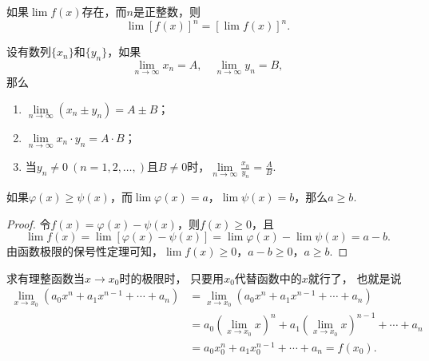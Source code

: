 \begin{corollary}
如果\(\lim f(x)\)存在，而\(n\)是正整数，则\[\lim [f(x)]^n = [\lim f(x)]^n.\]
\end{corollary}

\begin{theorem}
设有数列\(\{x_n\}\)和\(\{y_n\}\)，如果\[
\lim\limits_{n\to\infty}x_n = A,
\quad
\lim\limits_{n\to\infty}y_n = B,
\]那么\begin{enumerate}
\item \(\lim\limits_{n\to\infty}{(x_n \pm y_n)}=A \pm B\)；
\item \(\lim\limits_{n\to\infty}{x_n \cdot y_n}=A \cdot B\)；
\item 当\(y_n \neq 0\ (n=1,2,\dotsc,)\)且\(B \neq 0\)时，\(\lim\limits_{n\to\infty}{\frac{x_n}{y_n}}=\frac{A}{B}\).
\end{enumerate}
\end{theorem}

\begin{theorem}
如果\(\varphi(x) \geq \psi(x)\)，而\(\lim \varphi(x)=a\)，\(\lim \psi(x)=b\)，那么\(a \geq b\).
\begin{proof}
令\(f(x) = \varphi(x) - \psi(x)\)，则\(f(x) \geq 0\)，且\[
\lim f(x) = \lim[\varphi(x) - \psi(x)]
= \lim \varphi(x) - \lim \psi(x)
= a - b.
\]由函数极限的保号性定理可知，\(\lim f(x) \geq 0\)，\(a - b \geq 0\)，\(a \geq b\).
\end{proof}
\end{theorem}

\begin{example}\label{example:极限.有理整函数在一点的极限}
求有理整函数当\(x\to x_0\)时的极限时，
只要用\(x_0\)代替函数中的\(x\)就行了，
也就是说
\def\lx{\left(\lim\limits_{x \to x_0} x\right)}
\begin{align*}
	\lim\limits_{x \to x_0} (a_0 x^n + a_1 x^{n-1} + \dotsb + a_n)
	&= \lim\limits_{x \to x_0}{(a_0 x^n + a_1 x^{n-1} + \dotsb + a_n)} \\
	&= a_0 \lx^n + a_1 \lx^{n-1} + \dotsb + a_n \\
	&= a_0 x_0^n + a_1 x_0^{n-1} + \dotsb + a_n
	= f(x_0).
\end{align*}
\end{example}

